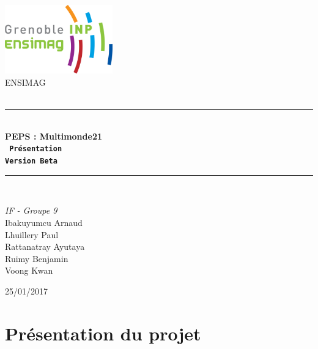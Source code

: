 \documentclass[a4paper,12pt]{article}
\newcommand{\HRule}{\rule{\linewidth}{0.5mm}} %
\begin{document}
\begin{titlepage}
\begin{center}

\includegraphics[width=0.35\textwidth]{logo}~\\[2.5cm] %

\textsc{\LARGE ENSIMAG}\\[1.5cm]
\textsc{\Large }\\[0.5cm]

\HRule \\[0.4cm]

{\Huge \bfseries \textsf{PEPS : Multimonde21}\\[0.5cm]
\texttt{ Présentation\\
Version Beta} \\[0.4cm] }

\HRule \\[1.5cm]

\begin{minipage}{0.4\textwidth}
\begin{center} \large
\emph{IF - Groupe 9}\\[2cm]
Ibakuyumcu Arnaud \\
Lhuillery Paul \\
Rattanatray Ayutaya \\
Ruimy Benjamin \\
Voong Kwan
\end{center}
\end{minipage}
\begin{minipage}{0.4\textwidth}
\end{minipage}

\vfill

\large {25/01/2017 }

\end{center}

\end{titlepage}
 \newpage


 \tableofcontents %
 \newpage

 \part{Présentation du projet}
\end{document}
